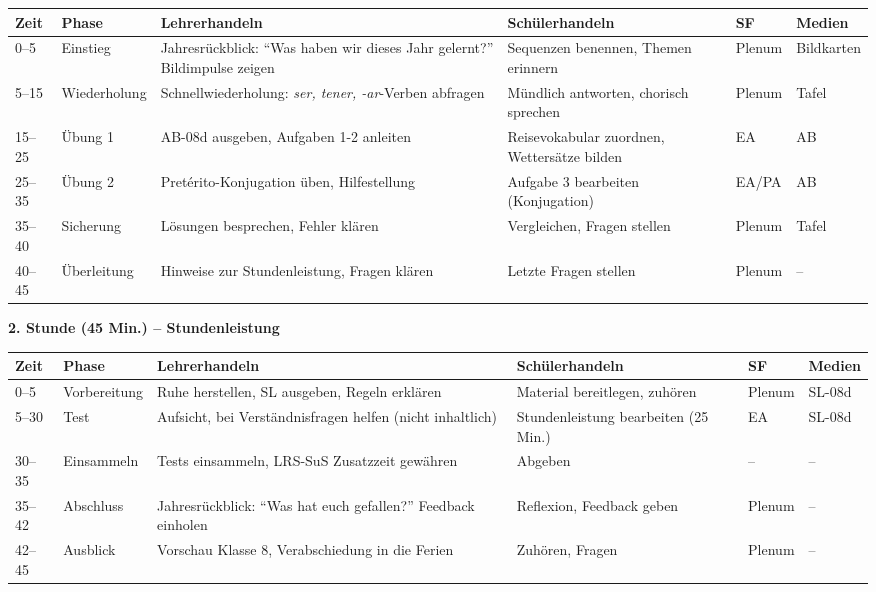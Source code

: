 \documentclass[11pt,a4paper]{article}
\begin{document}
\begin{longtable}{|p{1cm}|p{1.5cm}|p{4cm}|p{3cm}|p{2cm}|p{2cm}|}
\hline
\textbf{Zeit} & \textbf{Phase} & \textbf{Lehrerhandeln} & \textbf{Schülerhandeln} & \textbf{SF} & \textbf{Medien} \\
\hline
\endhead

0--5 & Einstieg & Jahresrückblick: ``Was haben wir dieses Jahr gelernt?'' Bildimpulse zeigen & Sequenzen benennen, Themen erinnern & Plenum & Bildkarten \\
\hline

5--15 & Wieder\-holung & Schnellwiederholung: \textit{ser, tener, -ar}-Verben abfragen & Mündlich antworten, chorisch sprechen & Plenum & Tafel \\
\hline

15--25 & Übung 1 & AB-08d ausgeben, Aufgaben 1-2 anleiten & Reisevokabular zuordnen, Wettersätze bilden & EA & AB \\
\hline

25--35 & Übung 2 & Pretérito-Konjugation üben, Hilfestellung & Aufgabe 3 bearbeiten (Konjugation) & EA/PA & AB \\
\hline

35--40 & Sicherung & Lösungen besprechen, Fehler klären & Vergleichen, Fragen stellen & Plenum & Tafel \\
\hline

40--45 & Über\-leitung & Hinweise zur Stundenleistung, Fragen klären & Letzte Fragen stellen & Plenum & -- \\
\hline
\end{longtable}

\vspace{1em}

\textbf{2. Stunde (45 Min.) -- Stundenleistung}

\begin{longtable}{|p{1cm}|p{1.5cm}|p{4cm}|p{3cm}|p{2cm}|p{2cm}|}
\hline
\textbf{Zeit} & \textbf{Phase} & \textbf{Lehrerhandeln} & \textbf{Schülerhandeln} & \textbf{SF} & \textbf{Medien} \\
\hline
\endhead

0--5 & Vorbe\-reitung & Ruhe herstellen, SL ausgeben, Regeln erklären & Material bereitlegen, zuhören & Plenum & SL-08d \\
\hline

5--30 & Test & Aufsicht, bei Verständnisfragen helfen (nicht inhaltlich) & Stundenleistung bearbeiten (25 Min.) & EA & SL-08d \\
\hline

30--35 & Einsammeln & Tests einsammeln, LRS-SuS Zusatzzeit gewähren & Abgeben & -- & -- \\
\hline

35--42 & Abschluss & Jahresrückblick: ``Was hat euch gefallen?'' Feedback einholen & Reflexion, Feedback geben & Plenum & -- \\
\hline

42--45 & Ausblick & Vorschau Klasse 8, Verabschiedung in die Ferien & Zuhören, Fragen & Plenum & -- \\
\hline
\end{longtable}
\end{document}
